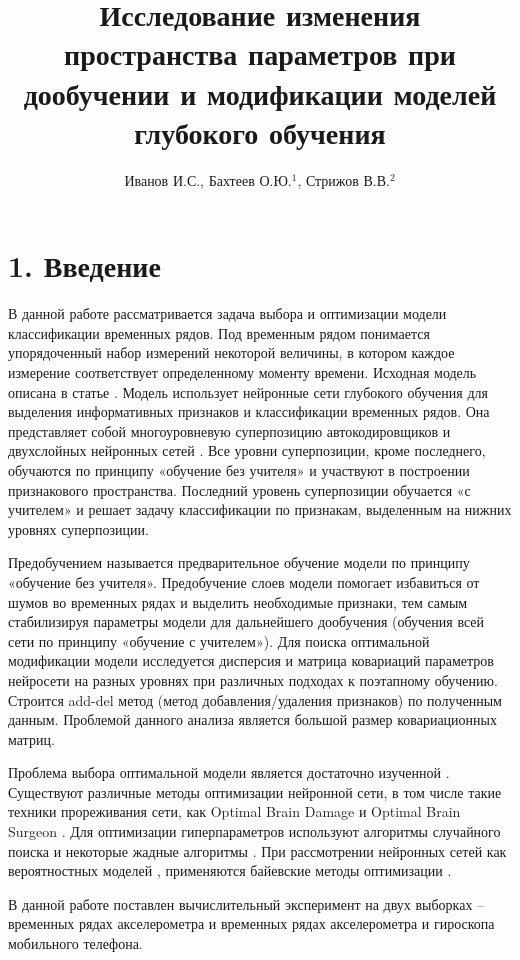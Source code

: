 \documentclass[12pt]{article}
\title
    {Исследование изменения пространства параметров при дообучении и модификации моделей глубокого обучения}
\author
    {Иванов И.С., Бахтеев О.Ю.$^1$, Стрижов В.В.$^2$}
\begin{document}
\maketitle
\section{1. Введение}
В данной работе рассматривается задача выбора и оптимизации модели классификации временных рядов. Под временным рядом понимается упорядоченный набор измерений некоторой величины, в котором каждое измерение соответствует определенному моменту времени. Исходная модель описана в статье \cite{Popova}. Модель использует нейронные сети глубокого обучения для выделения информативных признаков и классификации временных рядов. Она представляет собой многоуровневую суперпозицию автокодировщиков \cite{autoencoder} и двухслойных нейронных сетей \cite{two-layer-nn}. Все уровни суперпозиции, кроме последнего, обучаются по принципу «обучение без учителя» и участвуют в построении признакового пространства. Последний уровень суперпозиции обучается «с учителем» и решает задачу классификации по признакам, выделенным на нижних уровнях суперпозиции.

Предобучением называется предварительное обучение модели по принципу «обучение без учителя». Предобучение \cite{pre-train} слоев модели помогает избавиться от шумов во временных рядах и выделить необходимые признаки, тем самым стабилизируя параметры модели для дальнейшего дообучения (обучения всей сети по принципу «обучение с учителем»). Для поиска оптимальной модификации модели исследуется дисперсия и матрица ковариаций параметров нейросети на разных уровнях при различных подходах к поэтапному обучению. Строится add-del метод (метод добавления/удаления признаков) \cite{add-del} по полученным данным. Проблемой данного анализа является большой размер ковариационных матриц.

Проблема выбора оптимальной модели является достаточно изученной \cite{on-optim, tune, predict}. Существуют различные методы оптимизации нейронной сети, в том числе такие техники прореживания сети, как Optimal Brain Damage \cite{OBD} и Optimal Brain Surgeon \cite{OBS}. Для оптимизации гиперпараметров используют алгоритмы случайного поиска и некоторые жадные алгоритмы \cite{hyper-param, rand-hyper-param}. При рассмотрении нейронных сетей как вероятностных моделей \cite{prob-model}, применяются байевские методы оптимизации \cite{bayes}.

В данной работе поставлен вычислительный эксперимент на двух выборках -- временных рядах акселерометра и временных рядах акселерометра и гироскопа мобильного телефона.
\end{document}
